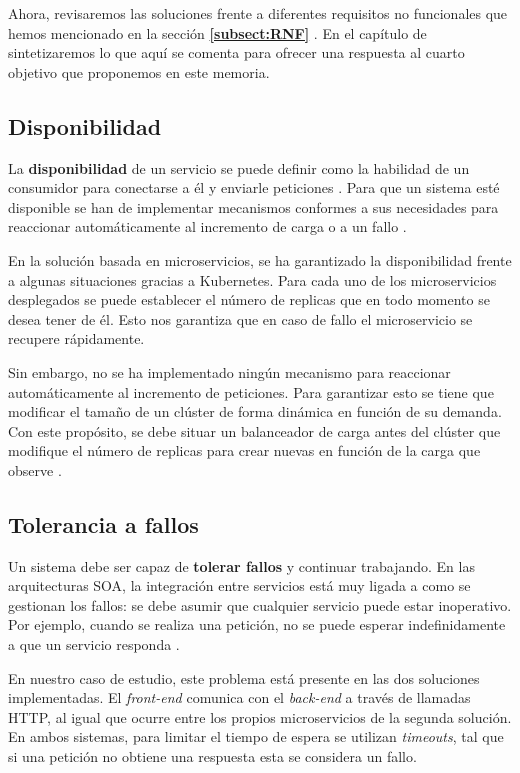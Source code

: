 \documentclass[11pt,spanish,listoffigures]{tfgetsinf}
\begin{document}
Ahora, revisaremos las soluciones frente a diferentes requisitos no funcionales que hemos mencionado en la sección \textbf{\ref{subsect:RNF} }. En el capítulo de \textbf{} sintetizaremos lo que aquí se comenta para ofrecer una respuesta al cuarto objetivo que proponemos en este memoria.

\subsection{Disponibilidad}

La \textbf{disponibilidad} de un servicio se puede definir como la habilidad de un consumidor para conectarse a él y enviarle peticiones \cite{Richards2016}. Para que un sistema esté disponible se han de implementar mecanismos conformes a sus necesidades para reaccionar automáticamente al incremento de carga o a un fallo \cite{Newman2015a}.

En la solución basada en microservicios, se ha garantizado la disponibilidad frente a algunas situaciones gracias a Kubernetes. Para cada uno de los microservicios desplegados se puede establecer el número de replicas que en todo momento se desea tener de él. Esto nos garantiza que en caso de fallo el microservicio se recupere rápidamente. 

Sin embargo, no se ha implementado ningún mecanismo para reaccionar automáticamente al incremento de peticiones. Para garantizar esto se tiene que modificar el tamaño de un clúster de forma dinámica en función de su demanda. Con este propósito, se debe situar un balanceador de carga antes del clúster que modifique el número de replicas para crear nuevas en función de la carga que observe \cite{Rensin2015}.

\subsection{Tolerancia a fallos}

Un sistema debe ser capaz de \textbf{tolerar fallos} y continuar trabajando. En las arquitecturas SOA, la integración entre servicios está muy ligada a como se gestionan los fallos: se debe asumir que cualquier servicio puede estar inoperativo. Por ejemplo, cuando se realiza una petición, no se puede esperar indefinidamente a que un servicio responda \cite{Newman2015a}.

En nuestro caso de estudio, este problema está presente en las dos soluciones implementadas. El \textit{front-end} comunica con el \textit{back-end} a través de llamadas HTTP, al igual que ocurre entre los propios microservicios de la segunda solución. En ambos sistemas, para limitar el tiempo de espera se utilizan \textit{timeouts}, tal que si una petición no obtiene una respuesta esta se considera un fallo.
\end{document}
